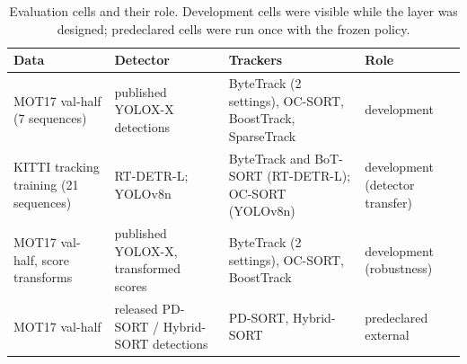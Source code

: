 \begin{table}[t]
\caption{Evaluation cells and their role. Development cells were visible while
the layer was designed; predeclared cells were run once with the frozen
policy.}
\label{tab:data}
\centering\footnotesize
\setlength{\tabcolsep}{4pt}
\begin{tabular}{@{}>{\raggedright\arraybackslash}p{36mm}>{\raggedright\arraybackslash}p{32mm}>{\raggedright\arraybackslash}p{50mm}>{\raggedright\arraybackslash}p{30mm}@{}}
\toprule
Data & Detector & Trackers & Role\\
\midrule
MOT17 val-half (7 sequences) & published YOLOX-X detections & ByteTrack (2 settings), OC-SORT, BoostTrack, SparseTrack & development\\
KITTI tracking training (21 sequences) & RT-DETR-L; YOLOv8n & ByteTrack and BoT-SORT (RT-DETR-L); OC-SORT (YOLOv8n) & development (detector transfer)\\
MOT17 val-half, score transforms & published YOLOX-X, transformed scores & ByteTrack (2 settings), OC-SORT, BoostTrack & development (robustness)\\
MOT17 val-half & released PD-SORT / Hybrid-SORT detections & PD-SORT, Hybrid-SORT & predeclared external\\
\bottomrule
\end{tabular}
\end{table}
